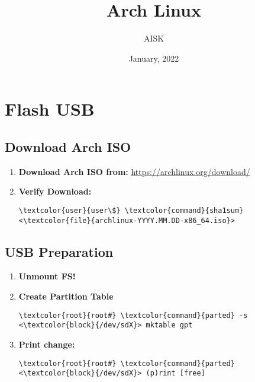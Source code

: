 \documentclass[10pt, a4paper, onecolumn, openany]{book} %
\title{\textbf{Arch Linux}}
\author{AISK}
\date{January, 2022}
\begin{document}
\maketitle
\tableofcontents

\chapter{Flash USB}
\section{Download Arch ISO}
\begin{enumerate}
    \item \textbf{Download Arch ISO from:}
\newline \underline{\href{https://archlinux.org/download/}{https://archlinux.org/download/}}
    \item \textbf{Verify Download:}
\begin{Verbatim}[commandchars=\\\{\}]
\textcolor{user}{user\$} \textcolor{command}{sha1sum} <\textcolor{file}{archlinux-YYYY.MM.DD-x86_64.iso}>
\end{Verbatim}
\end{enumerate}
\section{USB Preparation}
\begin{enumerate}
    \item \textbf{Unmount FS!}
    \item \textbf{Create Partition Table}
\begin{Verbatim}[commandchars=\\\{\}]
\textcolor{root}{root#} \textcolor{command}{parted} -s <\textcolor{block}{/dev/sdX}> mktable gpt
\end{Verbatim}
    \item \textbf{Print change:}
\begin{Verbatim}[commandchars=\\\{\}]
\textcolor{root}{root#} \textcolor{command}{parted} <\textcolor{block}{/dev/sdX}> (p)rint [free]
\end{Verbatim}
\end{enumerate}
\end{document}
